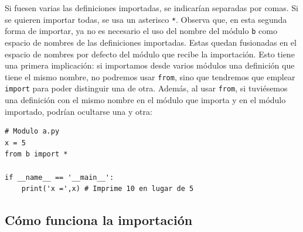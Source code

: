 Si fuesen varias las definiciones importadas, se indicarían separadas por comas. Si se quieren importar todas, se usa un asterisco \texttt{*}. Observa que, en esta segunda forma de importar, ya no es necesario el uso del nombre del módulo \texttt{b} como espacio de nombres de las definiciones importadas. Estas quedan fusionadas en el espacio de nombres por defecto del módulo que recibe la importación. Esto tiene una primera implicación: si importamos desde varios módulos una definición que tiene el mismo nombre, no podremos usar \texttt{from}, sino que tendremos que emplear \texttt{import} para poder distinguir una de otra. Además, al usar \texttt{from}, si tuviésemos una definición con el mismo nombre en el módulo que importa y en el módulo importado, podrían ocultarse una y otra:

\begin{lstlisting}
# Modulo a.py
x = 5
from b import *

if __name__ == '__main__':
    print('x =',x) # Imprime 10 en lugar de 5
\end{lstlisting}


\subsection{Cómo funciona la importación}


